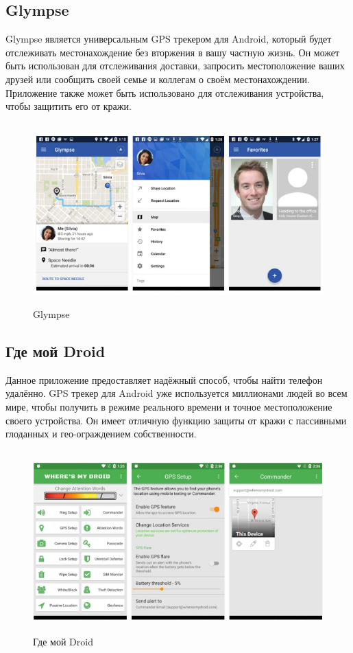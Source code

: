 \documentclass[a4paper,12pt]{article}
\begin{document}
\subsection{Glympse}
Glympse является универсальным GPS трекером для Android, который будет отслеживать местонахождение без вторжения в вашу частную жизнь. Он может быть использован для отслеживания доставки, запросить местоположение ваших друзей или сообщить своей семье и коллегам о своём местонахождении. Приложение также может быть использовано для отслеживания устройства, чтобы защитить его от кражи\cite{review5}.
\begin{figure}[H]
	\centering
	\includegraphics[width=13cm,height=7cm]{images/15023616597135.jpg}
	\caption{Glympse}
	\label{fig:card}
\end{figure}
\subsection{Где мой Droid}
Данное приложение предоставляет надёжный способ, чтобы найти телефон удалённо. GPS трекер для Android уже используется миллионами людей во всем мире, чтобы получить в режиме реального времени и точное местоположение своего устройства. Он имеет отличную функцию защиты от кражи с пассивными глоданных и гео-ограждением собственности\cite{review5}.
\begin{figure}[H]
	\centering
	\includegraphics[width=13cm, height=7cm]{images/15023616093087.jpg}
	\caption{Где мой Droid}
	\label{fig:card}
\end{figure}
\end{document}
